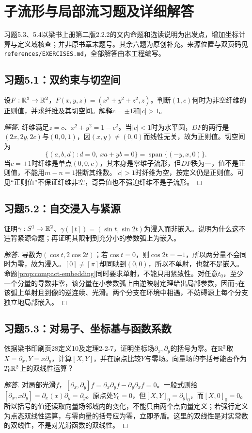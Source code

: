 \section{子流形与局部流习题及详细解答}
习题5.3、5.4以梁书上册第二版2.2.2的文内命题和选读说明为出发点，增加坐标计算与定义域核查；并非原书章末题号。其余六题为原创补充。来源位置与双页码见\texttt{references/EXERCISES.md}，全部解答由本工程编写。

\subsection*{习题5.1：双约束与切空间}
设$F:\mathbb{R}^3\to\mathbb{R}^2$，$F(x,y,z)=(x^2+y^2+z^2,z)$。判断$(1,c)$何时为非空纤维的正则值，并求纤维及其切空间。解释$c=\pm1$和$|c|>1$。
\begin{proof}[解答]
纤维满足$z=c$、$x^2+y^2=1-c^2$。当$|c|<1$时为水平圆，$DF$的两行是$(2x,2y,2c)$与$(0,0,1)$，因$(x,y)\ne(0,0)$而线性无关，故为正则值。切空间为
\[
 \{(a,b,d):d=0,\ xa+yb=0\}
 =\operatorname{span}\{(-y,x,0)\}.
\]
当$c=\pm1$时纤维是单点$(0,0,c)$，其本身是零维子流形，但$DF$秩为一，值不是正则值，不能用$m-n=1$推断其维数。$|c|>1$时纤维为空，按定义仍是正则值。可见“正则值”不保证纤维非空，奇异值也不强迫纤维不是子流形。
\end{proof}

\subsection*{习题5.2：自交浸入与紧源}
证明$\gamma:S^1\to\mathbb{R}^2$、$\gamma([t])=(\sin t,\sin2t)$为浸入而非嵌入。说明为什么这不违背紧源命题；再证明其限制到充分小的参数弧上为嵌入。
\begin{proof}[解答]
导数为$(\cos t,2\cos2t)$；若$\cos t=0$，则$\cos2t=-1$，所以两分量不会同时为零，故为浸入。$[0]\ne[\pi]$却同映到$(0,0)$，所以不单射，也就不是嵌入。命题\ref{prop:compact-embedding}同时要求单射，不能只用紧致性。对任意$t_0$，至少一个分量的导数非零，该分量在小参数弧上由逆映射定理给出局部参数，因而$\gamma$在该弧上单射且到像的逆连续、光滑。两个分支在环境中相遇，不妨碍源上每个分支独立地局部嵌入。
\end{proof}

\subsection*{习题5.3：对易子、坐标基与函数系数}
依据梁书印刷页28定义10及定理2-2-7，证明坐标场$\partial_x,\partial_y$的括号为零。在$\mathbb{R}^2$取$X=\partial_x,Y=x\partial_y$，计算$[X,Y]$，并在原点比较$Y$与零场。向量场的李括号能否作为$T_0\mathbb{R}^2$上的双线性运算？
\begin{proof}[解答]
对局部光滑$f$，$[\partial_x,\partial_y]f=\partial_x\partial_yf-\partial_y\partial_xf=0$。一般式则给$[\partial_x,x\partial_y]=\partial_x(x)\partial_y=\partial_y$。原点处$Y_0=0$，但$[X,Y]_0=\partial_y|_0$，而$[X,0]_0=0$。所以括号的值还读取向量场邻域内的变化，不能只由两个点向量定义；若强行定义为点态双线性运算，与零向量的括号应为零，立即矛盾。这里的双线性是对实常数的双线性，不是对光滑函数的双线性。
\end{proof}

